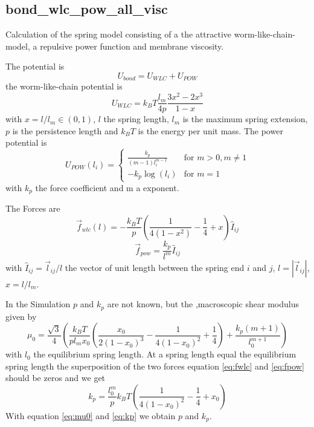 \subsection{bond\_wlc\_pow\_all\_visc}

Calculation of the spring model consisting of a the attractive worm-like-chain-model, a repulsive power function and membrane viscosity.

The potential is
%
\begin{equation}\label{eq:ubond}
	U_{bond} = U_{WLC} + U_{POW}
\end{equation}
%
the worm-like-chain potential is
%
\begin{equation}\label{eq:uwlc}
	U_{WLC} = k_BT\frac{l_m}{4p}\frac{3x^2-2x^3}{1-x} 
\end{equation}
%
with  $x=l/l_m \in (0,1)$, $l$ the spring length, $l_m$ is the maximum spring extension, $p$ is the persistence length and $k_BT$ is the energy per unit mass. 
The power potential is
% 
\begin{equation}\label{eq:upow}
 U_{POW}(l_i)=\begin{cases}
             \frac{k_p}{(m-1)l_i^{m-1}} & \text{for \ } m>0, m \neq 1 \\
		-k_p\log{(l_i)} & \text{for \ } m=1
            \end{cases}
\end{equation}
%
with $k_p$ the force coefficient and m a exponent.

The Forces are
%
\begin{equation}\label{eq:fwlc}
	\vec{f}_{wlc}(l) = -\frac{k_BT}{p}\left(\frac{1}{4(1-x^2)}-\frac{1}{4}+x\right)\hat{I}_{ij}
\end{equation}
%
\begin{equation}\label{eq:fpow}
	\vec{f}_{pow}=\frac{k_p}{l^m}\hat{I}_{ij}
\end{equation}
%
with $\hat{I}_{ij}=\vec{l}_{ij}/l$ the vector of unit length between the spring end $i$ and $j$, $l=|\vec{l}_{ij}|$, $x=l/l_m$.

In the Simulation $p$ and $k_p$ are not known, but the ,macroscopic shear modulus given by
%
\begin{equation}\label{eq:mu0}
	\mu_0 = \frac{\sqrt{3}}{4}\left(\frac{k_BT}{pl_mx_0}\left(\frac{x_0}{2(1-x_0)^3}-\frac{1}{4(1-x_0)^2}+\frac{1}{4}\right) + \frac{k_p(m+1)}{l_0^{m+1}}\right)
\end{equation}
%
with $l_0$ the equilibrium spring length. At a spring length equal the equilibrium spring length the superposition of the two forces equation \ref{eq:fwlc} and \ref{eq:fpow} should be zeros and we get
%
\begin{equation}\label{eq:kp}
	k_p = \frac{l_0^m}{p}k_BT \left(\frac{1}{4(1-x_0)^2}-\frac{1}{4}+x_0\right)
\end{equation}
%
With equation \ref{eq:mu0} and \ref{eq:kp}  we obtain $p$ and $k_p$.

